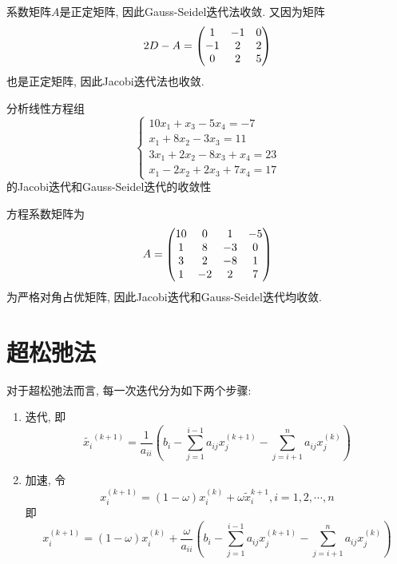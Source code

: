 \begin{solution}
    系数矩阵$A$是正定矩阵, 因此Gauss-Seidel迭代法收敛. 又因为矩阵
    \begin{equation*}
        2D-A=\mqty(
            1&-1&0\\
            -1&2&2\\
            0&2&5
        )
    \end{equation*}
    也是正定矩阵, 因此Jacobi迭代法也收敛.
\end{solution}

\begin{example}
    分析线性方程组
    \begin{equation*}
        \begin{cases}
            10x_1+x_3-5x_4=-7\\
            x_1+8x_2-3x_3=11\\
            3x_1+2x_2-8x_3+x_4=23\\
            x_1-2x_2+2x_3+7x_4=17
        \end{cases}
    \end{equation*}
    的Jacobi迭代和Gauss-Seidel迭代的收敛性
\end{example}

\begin{solution}
    方程系数矩阵为
    \begin{equation*}
        A=\mqty(
            10&0&1&-5\\
            1&8&-3&0\\
            3&2&-8&1\\
            1&-2&2&7
        )
    \end{equation*}
    为严格对角占优矩阵, 因此Jacobi迭代和Gauss-Seidel迭代均收敛.
\end{solution}

\section{超松弛法}

对于超松弛法而言, 每一次迭代分为如下两个步骤:
\begin{enumerate}
    \item 迭代, 即
    \begin{equation*}
        \widetilde{x_i}^{(k+1)}=\frac{1}{a_{ii}}\left(b_i-\sum_{j=1}^{i-1}a_{ij}x_j^{(k+1)}-\sum_{j=i+1}^na_{ij}x_j^{(k)}\right)
    \end{equation*}
    \item 加速, 令 
    \begin{equation*}
        x_i^{(k+1)}=(1-\omega)x_i^{(k)}+\omega\widetilde{x}_i^{k+1}, i=1,2,\cdots,n
    \end{equation*}
    即
    \begin{equation*}
        x_i^{(k+1)}=(1-\omega)x_i^{(k)}+\frac{\omega}{a_{ii}}\left(b_i-\sum_{j=1}^{i-1}a_{ij}x_j^{(k+1)}-\sum_{j=i+1}^na_{ij}x_j^{(k)}\right)
    \end{equation*}
\end{enumerate}

